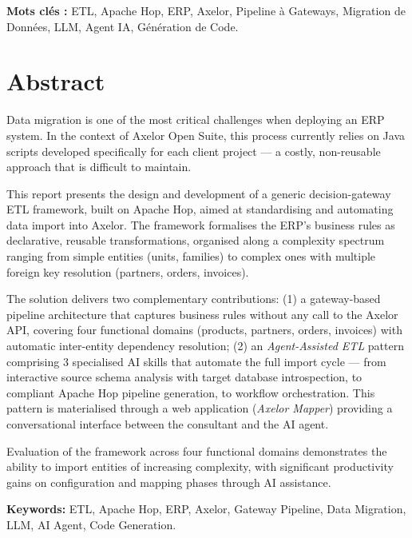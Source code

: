 \documentclass[a4paper,12pt]{article}
\begin{document}
\textbf{Mots clés :} ETL, Apache Hop, ERP, Axelor, Pipeline à Gateways, Migration de Données, LLM, Agent IA, Génération de Code.

\section*{Abstract}

Data migration is one of the most critical challenges when deploying an ERP system. In the context of Axelor Open Suite, this process currently relies on Java scripts developed specifically for each client project — a costly, non-reusable approach that is difficult to maintain.

This report presents the design and development of a generic decision-gateway ETL framework, built on Apache Hop, aimed at standardising and automating data import into Axelor. The framework formalises the ERP's business rules as declarative, reusable transformations, organised along a complexity spectrum ranging from simple entities (units, families) to complex ones with multiple foreign key resolution (partners, orders, invoices).

The solution delivers two complementary contributions: (1) a gateway-based pipeline architecture that captures business rules without any call to the Axelor API, covering four functional domains (products, partners, orders, invoices) with automatic inter-entity dependency resolution; (2) an \textit{Agent-Assisted ETL} pattern comprising 3 specialised AI skills that automate the full import cycle — from interactive source schema analysis with target database introspection, to compliant Apache Hop pipeline generation, to workflow orchestration. This pattern is materialised through a web application (\textit{Axelor Mapper}) providing a conversational interface between the consultant and the AI agent.

Evaluation of the framework across four functional domains demonstrates the ability to import entities of increasing complexity, with significant productivity gains on configuration and mapping phases through AI assistance.

\textbf{Keywords:} ETL, Apache Hop, ERP, Axelor, Gateway Pipeline, Data Migration, LLM, AI Agent, Code Generation.

\newpage
\tableofcontents

\newpage
\listoffigures
\end{document}
